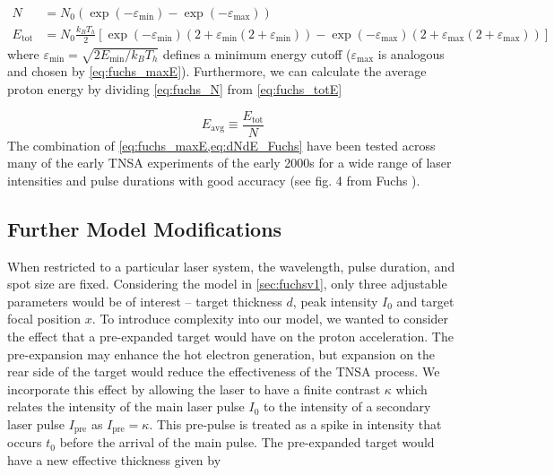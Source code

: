 \begin{align}
	N &= N_0 (\exp(-\varepsilon_\text{min}) - \exp(-\varepsilon_\text{max})) \label{eq:fuchs_N} \\
	E_\text{tot} &= N_0 \frac{k_B T_h}{2}[\exp(-\varepsilon_\text{min})(2 + \varepsilon_\text{min}(2 + \varepsilon_\text{min})) - \exp(-\varepsilon_\text{max})(2 + \varepsilon_\text{max}(2 + \varepsilon_\text{max}))] \label{eq:fuchs_totE}
\end{align}
where $\varepsilon_\text{min} = \sqrt{2 E_\text{min} / k_B T_h}$ defines a minimum energy cutoff ($\varepsilon_\text{max}$ is analogous and chosen by \cref{eq:fuchs_maxE}). Furthermore, we can calculate the average proton energy by dividing \cref{eq:fuchs_N} from \cref{eq:fuchs_totE}

\begin{equation}
	E_\text{avg} \equiv \frac{E_\text{tot}}{N}
\end{equation}
The combination of \cref{eq:fuchs_maxE,eq:dNdE_Fuchs} have been tested across many of the early \gls{TNSA} experiments of the early 2000s for a wide range of laser intensities and pulse durations with good accuracy (see fig. 4 from Fuchs \cite{Fuchs_2005_Nat}).

\subsection{Further Model Modifications} \label{sec:fuchsv2}
When restricted to a particular laser system, the wavelength, pulse duration, and spot size are fixed. Considering the model in \cref{sec:fuchsv1}, only three adjustable parameters would be of interest -- target thickness $d$, peak intensity $I_0$ and target focal position $x$. To introduce complexity into our model, we wanted to consider the effect that a pre-expanded target would have on the proton acceleration. The pre-expansion may enhance the hot electron generation, but expansion on the rear side of the target would reduce the effectiveness of the \gls{TNSA} process. We incorporate this effect by allowing the laser to have a finite contrast $\kappa$ which relates the intensity of the main laser pulse $I_0$ to the intensity of a secondary laser pulse $I_\text{pre}$ as $I_\text{pre} = \kappa$. This pre-pulse is treated as a spike in intensity that occurs $t_0$ before the arrival of the main pulse. The pre-expanded target would have a new effective thickness given by 

